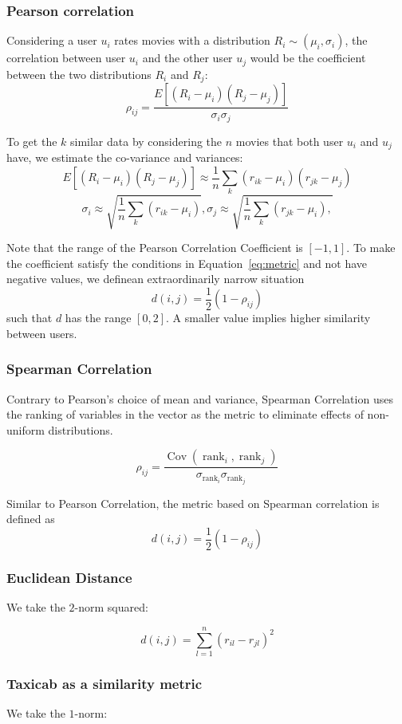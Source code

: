 \documentclass[final]{cvpr}
\begin{document}
\subsubsection{Pearson correlation}
Considering a user $u_i$ rates movies with a distribution $R_i \sim (\mu_i,\sigma_i)$,
the correlation between user $u_i$ and the other user $u_j$
would be the coefficient between the two distributions $R_i$ and $R_j$:
$$ \rho_{ij} = \frac{E[(R_i - \mu_i)(R_j - \mu_j)]}{\sigma_i \sigma_j} $$

To get the $k$ similar data by considering the $n$ movies that both user $u_i$ and $u_j$ have, we estimate the co-variance and variances:
$$ E[(R_i-\mu_i)(R_j-\mu_j)] \approx \frac{1}{n} \sum_k (r_{ik} - \mu_i) (r_{jk} - \mu_j)$$
$$ \sigma_i \approx \sqrt{\frac{1}{n} \sum_k (r_{ik} - \mu_i)} ,
 \sigma_j \approx \sqrt{\frac{1}{n} \sum_k (r_{jk} - \mu_i) ,}$$

Note that the range of the Pearson Correlation Coefficient is $[-1,1]$.
To make the coefficient satisfy the conditions in Equation~\ref{eq:metric}
and not have negative values, we definean extraordinarily narrow situation
$$ d(i, j) = \frac12 \left(1 - \rho_{ij}\right) $$
such that $d$ has the range $[0, 2]$.
A smaller value implies higher similarity between users.

\subsubsection{Spearman Correlation}
Contrary to Pearson's choice of mean and variance,
Spearman Correlation uses the ranking of variables in the vector as the metric
to eliminate effects of non-uniform distributions.

$$ \rho_{ij} = \frac{
	\operatorname{Cov}({\operatorname{rank}_i, \operatorname{rank}_j})
}{
	\sigma_{\operatorname{rank}_i} \sigma_{\operatorname{rank}_j}
} $$

Similar to Pearson Correlation, the metric based on Spearman correlation is defined as
$$ d(i, j) = \frac12 \left(1 - \rho_{ij}\right) $$

\subsubsection{Euclidean Distance}
We take the $2$-norm squared:

$$ d(i, j) = \sum_{l=1}^n \left( r_{il} - r_{jl} \right)^2 $$

\subsubsection{Taxicab as a similarity metric}
We take the $1$-norm:
\end{document}
